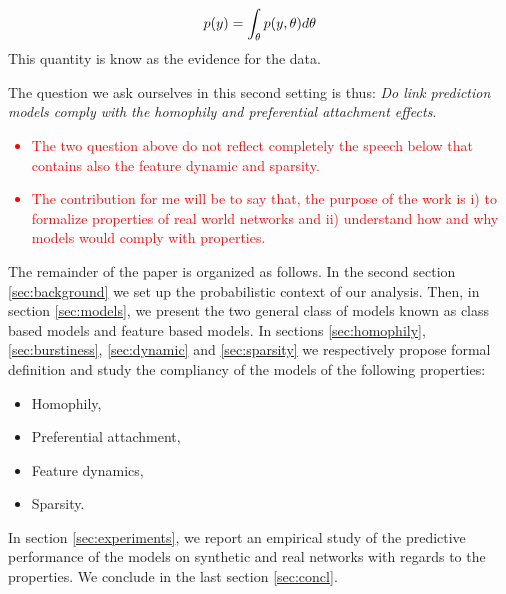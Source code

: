 \begin{equation}
p(y) = \int_{\theta} p(y,\theta) d\theta
\end{equation}
This quantity is know as the evidence for the data.

The question we ask ourselves in this second setting is thus: \textit{Do link prediction models comply with the homophily and preferential attachment effects}.

\textcolor{red}{
    \begin{itemize}
    \item The two question above do not reflect completely the speech below that contains also the feature dynamic and sparsity.
    \item The contribution for me will be to say that, the purpose of the work is i) to formalize properties of real world networks and ii) understand how and why models would comply with properties.
\end{itemize}
}


The remainder of the paper is organized as follows. In the second section \ref{sec:background} we set up the probabilistic context of our analysis. Then, in section \ref{sec:models}, we present the two general class of models known as class based models and feature based models. In sections \ref{sec:homophily}, \ref{sec:burstiness}, \ref{sec:dynamic} and \ref{sec:sparsity} we respectively propose formal definition and study the compliancy of the models of the following properties:
\begin{itemize}
    \item Homophily,
    \item Preferential attachment,
    \item Feature dynamics,
    \item Sparsity.
\end{itemize}

In section \ref{sec:experiments}, we report an empirical study of the predictive performance of the models on synthetic and real networks with regards to the properties. We conclude in the last section \ref{sec:concl}. 

